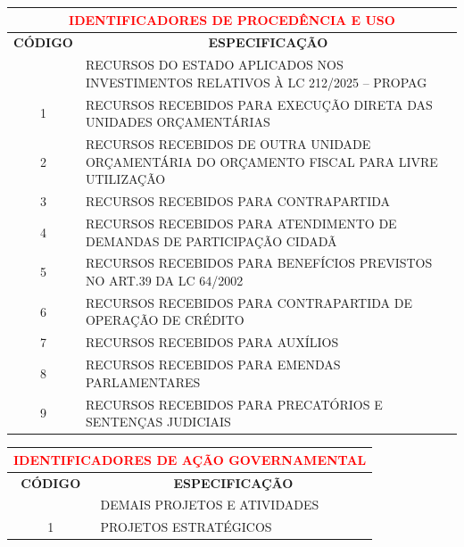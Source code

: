\documentclass{article}
\begin{document}
\noindent\begin{longtable}[c]{m{1cm}|m{14cm}}
\multicolumn{2}{c}{\cellcolor{gray!50} \textcolor{red} {\normalsize \textbf{ IDENTIFICADORES DE PROCEDÊNCIA E USO}}}\Tstrut  \\[2ex]
\hline\hline
\multicolumn{1}{c|}{\textbf{CÓDIGO}} & \multicolumn{1}{c}{\textbf{ESPECIFICAÇÃO}} \\
\hline
\endfirsthead
\hline
\endhead
\endfoot
\hline\hline\hline
\endlastfoot
\multicolumn{1}{c|}{ 0 } & RECURSOS DO ESTADO APLICADOS NOS INVESTIMENTOS RELATIVOS À LC 212/2025 – PROPAG \\
\multicolumn{1}{c|}{ 1 } & RECURSOS RECEBIDOS PARA EXECUÇÃO DIRETA DAS UNIDADES ORÇAMENTÁRIAS \\
\multicolumn{1}{c|}{ 2 } & RECURSOS RECEBIDOS DE OUTRA UNIDADE ORÇAMENTÁRIA DO ORÇAMENTO FISCAL PARA LIVRE UTILIZAÇÃO \\
\multicolumn{1}{c|}{ 3 } & RECURSOS RECEBIDOS PARA CONTRAPARTIDA \\
\multicolumn{1}{c|}{ 4 } & RECURSOS RECEBIDOS PARA ATENDIMENTO DE DEMANDAS DE PARTICIPAÇÃO CIDADÃ \\
\multicolumn{1}{c|}{ 5 } & RECURSOS RECEBIDOS PARA BENEFÍCIOS PREVISTOS NO ART.39 DA LC 64/2002 \\
\multicolumn{1}{c|}{ 6 } & RECURSOS RECEBIDOS PARA CONTRAPARTIDA DE OPERAÇÃO DE CRÉDITO \\
\multicolumn{1}{c|}{ 7 } & RECURSOS RECEBIDOS PARA AUXÍLIOS \\
\multicolumn{1}{c|}{ 8 } & RECURSOS RECEBIDOS PARA EMENDAS PARLAMENTARES \\
\multicolumn{1}{c|}{ 9 } & RECURSOS RECEBIDOS PARA PRECATÓRIOS E SENTENÇAS JUDICIAIS \\
\end{longtable}
\newpage
\noindent\begin{longtable}[c]{m{1cm}|m{11cm}}
\multicolumn{2}{c}{\cellcolor{gray!50} \textcolor{red} {\normalsize \textbf{ IDENTIFICADORES DE AÇÃO GOVERNAMENTAL}}}\Tstrut  \\[2ex]
\hline\hline
\multicolumn{1}{c|}{\textbf{CÓDIGO}} & \multicolumn{1}{c}{\textbf{ESPECIFICAÇÃO}} \\
\hline
\endfirsthead
\hline
\endhead
\endfoot
\hline\hline\hline
\endlastfoot
\multicolumn{1}{c|}{ 0 } & DEMAIS PROJETOS E ATIVIDADES \\
\multicolumn{1}{c|}{ 1 } & PROJETOS ESTRATÉGICOS \\
\end{longtable}
% 
\end{document}
